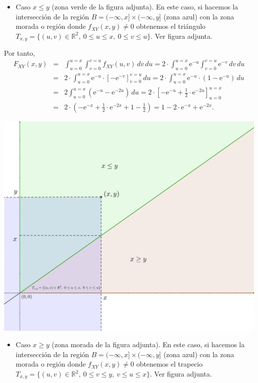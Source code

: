 \documentclass[]{book}
\providecommand{\tightlist}{%
  \setlength{\itemsep}{0pt}\setlength{\parskip}{0pt}}
\begin{document}
\begin{itemize}
\tightlist
\item
  Caso \(x\leq y\) (zona verde de la figura adjunta). En este caso, si hacemos la intersección de la región \(B=(-\infty,x]\times (-\infty,y]\) (zona azul) con la zona morada o región donde \(f_{XY}(x,y)\neq 0\) obtenemos el triángulo \(T_{x,y}=\{(u,v)\in\mathbb{R}^2,\ 0\leq u\leq x,\ 0\leq v\leq u\}.\) Ver figura adjunta.
\end{itemize}

Por tanto,
\[
\begin{array}{lcr}
F_{XY}(x,y) & = & \int_{u=0}^{u=x}\int_{v=0}^{v=u} f_{XY}(u,v)\,dv\,du= 2 \cdot\int_{u=0}^{u=x} \mathrm{e}^{-u}\int_{v=0}^{v=u}  \mathrm{e}^{-v}\,dv\,du\\ &  = & 
2 \cdot\int_{u=0}^{u=x} \mathrm{e}^{-u}\cdot\left[-\mathrm{e}^{-v}\right]_{v=0}^{v=u}\, du =  2 \cdot\int_{u=0}^{u=x} \mathrm{e}^{-u} \cdot (1-\mathrm{e}^{-u})\, du 
\\ & = & 2 \int_{u=0}^{u=x} \left(\mathrm{e}^{-u}-\mathrm{e}^{-2u}\right)\, du=2\cdot \left[-\mathrm{e}^{-u}+\frac{1}{2}\cdot\mathrm{e}^{-2u}\right]_{u=0}^{u=x}  \\ & = &
2\cdot\left(-\mathrm{e}^{-x}+\frac{1}{2}\cdot\mathrm{e}^{-2x}+1-\frac{1}{2}\right) =1-2\cdot\mathrm{e}^{-x}+\mathrm{e}^{-2x}.
\end{array}
\]

\includegraphics{Images/Ejemplo2Bidi3.png}

\begin{itemize}
\tightlist
\item
  Caso \(x\geq y\) (zona morada de la figura adjunta). En este caso, si hacemos la intersección de la región \(B=(-\infty,x]\times (-\infty,y]\) (zona azul) con la zona morada o región donde \(f_{XY}(x,y)\neq 0\) obtenemos el trapecio \(T_{x,y}=\{(u,v)\in\mathbb{R}^2,\ 0\leq v\leq y,\ v\leq u\leq x\}.\) Ver figura adjunta.
\end{itemize}
\end{document}
